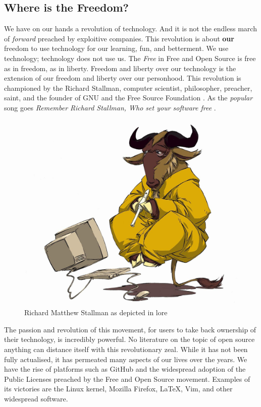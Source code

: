 \documentclass{article}
\begin{document}
\subsection{Where is the Freedom?}
We have on our hands a revolution of technology. 
And it is not the endless march of \textit{forward} preached by exploitive companies.
This revolution is about \textbf{our} freedom to use technology for our learning, fun, and betterment.
We use technology; technology does not use us. 
The \textit{Free} in Free and Open Source is free as in freedom, as in liberty.
Freedom and liberty over our technology is the extension of our freedom and liberty over our personhood.
This revolution is championed by the Richard Stallman, computer scientist, philosopher, preacher, saint, and the founder of GNU and the Free Source Foundation \cite{b0_stallman}.
As the \textit{popular} song goes \textit{Remember Richard Stallman,
Who set your software free} \cite{song_GNUs_Not_Unix}.

\begin{figure}[h]
    \centering
    \includegraphics[width=\textwidth]{the_wise_gnu.jpg}
    \caption{Richard Matthew Stallman as depicted in lore}
    \label{fig:rms}
\end{figure}

The passion and revolution of this movement, for users to take back ownership of their technology, is incredibly powerful. 
No literature on the topic of open source anything can distance itself with this revolutionary zeal. 
While it has not been fully actualised, it has permeated many aspects of our lives over the years.
We have the rise of platforms such as GitHub and the widespread adoption of the Public Licenses preached by the Free and Open Source movement. 
Examples of its victories are the Linux kernel, Mozilla Firefox, \LaTeX, Vim, and other widespread software. 
\end{document}
